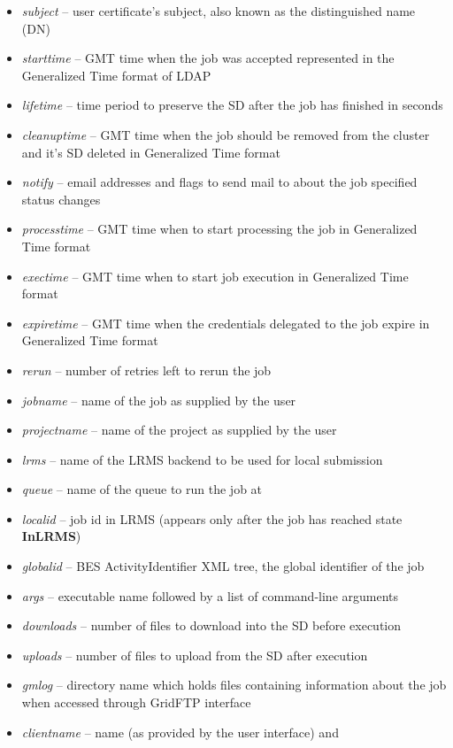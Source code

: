 \documentclass{article}                            %
\begin{document}
\begin{itemize}
\begin{itemize}
\item \textit{subject} -- user certificate's subject, also known as the distinguished
name (DN)
\item \textit{starttime} -- GMT time when the job was accepted represented
in the Generalized Time format of LDAP 
\item \textit{lifetime} -- time period to preserve the SD after the job has
finished in seconds
\item \textit{cleanuptime} -- GMT time when the job should be removed from
the cluster and it's SD deleted in Generalized Time format
\item \textit{notify} -- email addresses and flags to send mail to about
the job specified status changes
\item \textit{processtime} -- GMT time when to start processing the job in
Generalized Time format
\item \textit{exectime} -- GMT time when to start job execution in Generalized
Time format
\item \textit{expiretime} -- GMT time when the credentials delegated to the
job expire in Generalized Time format
\item \textit{rerun} -- number of retries left to rerun the job
\item \textit{jobname} -- name of the job as supplied by the user
\item \textit{projectname} -- name of the project as supplied by the user
\item \textit{lrms} -- name of the LRMS backend to be used for local submission
\item \textit{queue} -- name of the queue to run the job at
\item \textit{localid} -- job id in LRMS (appears only after the job has
reached state \textbf{InLRMS})
\item \textit{globalid} -- BES ActivityIdentifier XML tree, the global
identifier of the job
\item \textit{args} -- executable name followed by a list of command-line
arguments
\item \textit{downloads} -- number of files to download into the SD before
execution
\item \textit{uploads} -- number of files to upload from the SD after execution
\item \textit{gmlog} -- directory name which holds files containing information
about the job when accessed through GridFTP interface
\item \textit{clientname} -- name (as provided by the user interface) and

\end{itemize}
\end{itemize}
\end{document}
